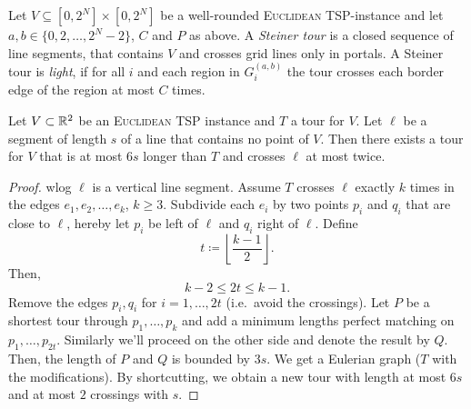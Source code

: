 \documentclass[../skript.tex]{subfiles}
\begin{document}
Let $V \subseteq [0, 2^N] \times [0, 2^N]$ be a well-rounded \textsc{Euclidean TSP}-instance and let $a, b \in \{ 0, 2, \ldots, 2^N - 2 \}$, $C$ and $P$ as above.
A \emph{Steiner tour} is a closed sequence of line segments, that contains $V$ and crosses grid lines only in portals. A Steiner tour is \emph{light}, if for all $i$ and each region in $G_i^{(a, b)}$ the tour crosses each border edge of the region at most $C$ times.
\begin{lemma} %
\label{thm:95}
Let $V \subset \mathbb{R}^2$ be an \textsc{Euclidean TSP} instance and $T$ a tour for $V$. Let $\ell$ be a segment of length $s$ of a line that contains no point of $V$. Then there exists a tour for $V$ that is at most $6s$ longer than $T$ and crosses $\ell$ at most twice.
\end{lemma}
\begin{proof}
\ac{wlog} $\ell$ is a vertical line segment. Assume $T$ crosses $\ell$ exactly $k$ times in the edges $e_1, e_2, \ldots, e_k$, $k \geq 3$.
Subdivide each $e_i$ by two points $p_i$ and $q_i$ that are close to $\ell$, hereby let $p_i$ be left of $\ell$ and $q_i$ right of $\ell$.
Define
\[
	t \coloneqq \left\lfloor \frac{k-1}{2} \right\rfloor.
\]
Then,
\[
	k - 2 \leq 2 t \leq k - 1.
\]
Remove the edges $p_i, q_i$ for $i = 1, \ldots, 2t$ (i.e.\ avoid the crossings). Let $P$ be a shortest tour through $p_1, \ldots, p_k$ and add a minimum lengths perfect matching on $p_1, \ldots, p_{2t}$. Similarly we'll proceed on the other side and denote the result by $Q$.
Then, the length of $P$ and $Q$ is bounded by $3s$.
We get a Eulerian graph ($T$ with the modifications). By shortcutting, we obtain a new tour with length at most $6s$ and at most $2$ crossings with $s$.
\end{proof}
\end{document}
